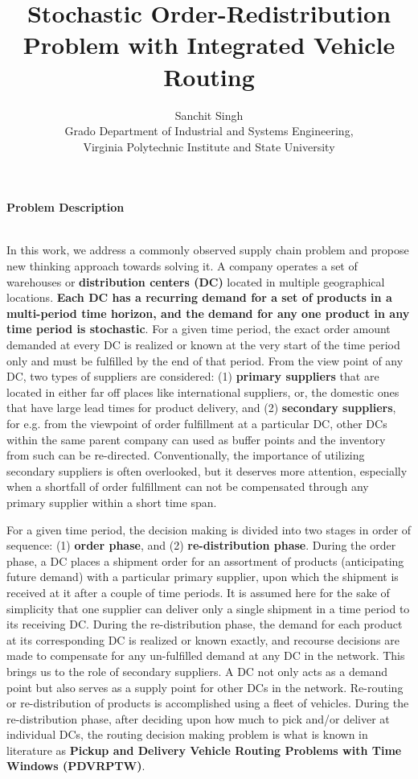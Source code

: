 \documentclass[11pt,letter]{article}
\title{Stochastic Order-Redistribution Problem with Integrated Vehicle Routing\\}
\author{%
	Sanchit Singh \\
	Grado Department of Industrial and Systems Engineering, \\
	Virginia Polytechnic Institute and State University \\
	\vspace{20pt}
	}
\makeatletter
\def\printtitle{%
    {\color{bl} \centering \huge \sc \textbf{\@title}\par}}		%
\def\printauthor{%
    {\centering \small \@author}}				%
\makeatother
\begin{document}

\printtitle 

\printauthor
\noindent
\textbf{Problem Description}
\\
\\
\begin{it}
In this work, we address a commonly observed supply chain problem and propose new thinking approach towards solving it. A company operates a set of warehouses or \textbf{distribution centers (DC)} located in multiple geographical locations. \textbf{Each DC has a recurring demand for a set of products in a multi-period time horizon, and the demand for any one product in any time period is stochastic}. For a given time period, the exact order amount demanded at every DC is realized or known at the very start of the time period only and must be fulfilled by the end of that period. From the view point of any DC, two types of suppliers are considered: (1) \textbf{primary suppliers} that are located in either far off places like international suppliers, or, the domestic ones that have large lead times for product delivery, and (2) \textbf{secondary suppliers}, for e.g. from the viewpoint of order fulfillment at a particular DC, other DCs within the same parent company can used as buffer points and the inventory from such can be re-directed. Conventionally, the importance of utilizing secondary suppliers is often overlooked, but it deserves more attention, especially when a shortfall of order fulfillment can not be compensated through any primary supplier within a short time span. 

For a given time period, the decision making is divided into two stages in order of sequence: (1) \textbf{order phase}, and (2) \textbf{re-distribution phase}. During the order phase, a DC places a shipment order for an assortment of products (anticipating future demand) with a particular primary supplier, upon which the shipment is received at it after a couple of time periods. It is assumed here for the sake of simplicity that one supplier can deliver only a single shipment in a time period to its receiving DC. During the re-distribution phase, the demand for each product at its corresponding DC is realized or known exactly, and recourse decisions are made to compensate for any un-fulfilled demand at any DC in the network. This brings us to the role of secondary suppliers. A DC not only acts as a demand point but also serves as a supply point for other DCs in the network. Re-routing or re-distribution of products is accomplished using a fleet of vehicles. During the re-distribution phase, after deciding upon how much to pick and/or deliver at individual DCs, the routing decision making problem is what is known in literature as \textbf{Pickup and Delivery Vehicle Routing Problems with Time Windows (PDVRPTW)}.
\end{it}
\end{document}
